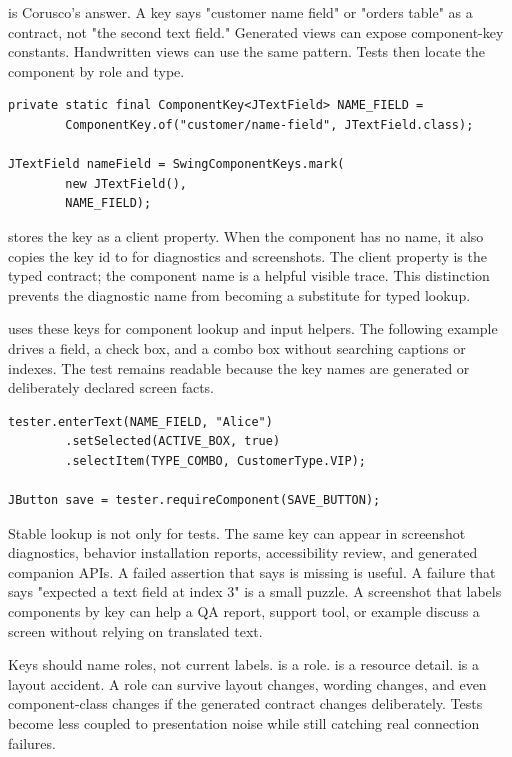 is Corusco's answer. A key says "customer name field" or "orders table" as a contract, not "the second text field." Generated views can expose component-key constants. Handwritten views can use the same pattern. Tests then locate the component by role and type.

\begin{lstlisting}[caption={Marking a component with a typed key.}]
private static final ComponentKey<JTextField> NAME_FIELD =
        ComponentKey.of("customer/name-field", JTextField.class);

JTextField nameField = SwingComponentKeys.mark(
        new JTextField(),
        NAME_FIELD);
\end{lstlisting}

 stores the key as a client property. When the component has no name, it also copies the key id to  for diagnostics and screenshots. The client property is the typed contract; the component name is a helpful visible trace. This distinction prevents the diagnostic name from becoming a substitute for typed lookup.

 uses these keys for component lookup and input helpers. The following example drives a field, a check box, and a combo box without searching captions or indexes. The test remains readable because the key names are generated or deliberately declared screen facts.

\begin{lstlisting}[caption={Driving components by generated-style keys.}]
tester.enterText(NAME_FIELD, "Alice")
        .setSelected(ACTIVE_BOX, true)
        .selectItem(TYPE_COMBO, CustomerType.VIP);

JButton save = tester.requireComponent(SAVE_BUTTON);
\end{lstlisting}

Stable lookup is not only for tests. The same key can appear in screenshot diagnostics, behavior installation reports, accessibility review, and generated companion APIs. A failed assertion that says  is missing is useful. A failure that says "expected a text field at index 3" is a small puzzle. A screenshot that labels components by key can help a QA report, support tool, or example discuss a screen without relying on translated text.

Keys should name roles, not current labels.  is a role.  is a resource detail.  is a layout accident. A role can survive layout changes, wording changes, and even component-class changes if the generated contract changes deliberately. Tests become less coupled to presentation noise while still catching real connection failures.

